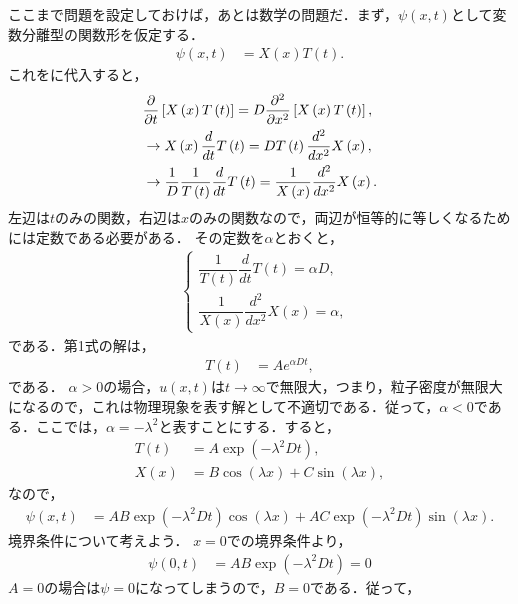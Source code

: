ここまで問題を設定しておけば，あとは数学の問題だ．まず，$\psi(x,t)$として変数分離型の関数形を仮定する．
\begin{align}
\psi\left(x,t\right) & =X\left(x\right)T\left(t\right).
\end{align}
%
これをに代入すると，
%
\begin{align}
 & \dfrac{\partial}{\partial t}\left[X\left(x\right)T\left(t\right)\right]=D\dfrac{\partial^{2}}{\partial x^{2}}\left[X\left(x\right)T\left(t\right)\right],\notag\\
 & \to X\left(x\right)\dfrac{d}{dt}T\left(t\right)=DT\left(t\right)\dfrac{d^{2}}{dx^{2}}X\left(x\right),\notag\\
 & \to\dfrac{1}{D}\dfrac{1}{T\left(t\right)}\dfrac{d}{dt}T\left(t\right)=\dfrac{1}{X\left(x\right)}\dfrac{d^{2}}{dx^{2}}X\left(x\right).
\end{align}
左辺は$t$のみの関数，右辺は$x$のみの関数なので，両辺が恒等的に等しくなるためには定数である必要がある．
その定数を$\alpha$とおくと，
\begin{align}
 & \begin{cases}
\dfrac{1}{T\left(t\right)}\dfrac{d}{dt}T\left(t\right)=\alpha D,\\[.4cm]
\dfrac{1}{X\left(x\right)}\dfrac{d^{2}}{dx^{2}}X\left(x\right)=\alpha,
\end{cases}
\end{align}
である．第1式の解は，
\begin{align}
T\left(t\right) & =Ae^{\alpha Dt},
\end{align}
である．
$\alpha>0$の場合，$u\left(x,t\right)$は$t\to\infty$で無限大，つまり，粒子密度が無限大になるので，これは物理現象を表す解として不適切である．従って，$\alpha<0$である．ここでは，$\alpha=-\lambda^{2}$と表すことにする．すると，
\begin{align}
T\left(t\right) & =A\exp\left(-\lambda^{2}Dt\right),\\
X\left(x\right) & =B\cos\left(\lambda x\right)+C\sin\left(\lambda x\right),
\end{align}
なので，
\begin{align}
\psi\left(x,t\right) & =AB\exp\left(-\lambda^{2}Dt\right)\cos\left(\lambda x\right)+AC\exp\left(-\lambda^{2}Dt\right)\sin\left(\lambda x\right).
\end{align}
境界条件について考えよう．
$x=0$での境界条件より，
\begin{align}
\psi\left(0,t \right) & =AB\exp\left(-\lambda^{2}Dt\right)=0
\end{align}
$A=0$の場合は$\psi=0$になってしまうので，$B=0$である．従って，
